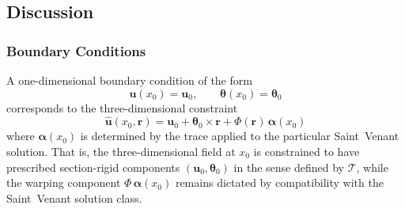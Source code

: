 
\clearpage 

\subsection{Discussion}


\subsubsection{Boundary Conditions}

A one-dimensional boundary condition of the form
\begin{equation}
\bm{u}(x_0) = \bm{u}_0, \qquad \bm{\theta}(x_0) = \bm{\theta}_0
\label{eq:1d-bc}
\end{equation}
corresponds to the three-dimensional constraint
\begin{equation}
\hat{\bm{u}}(x_0, \bm{r}) = \bm{u}_0 + \bm{\theta}_0 \times \bm{r} + \Phi(\bm{r})\,\bm{\alpha}(x_0)
\label{eq:3d-bc}
\end{equation}
where $\bm{\alpha}(x_0)$ is determined by the trace applied to the particular 
Saint~Venant solution. 
That is, the three-dimensional field at $x_0$ is 
constrained to have prescribed section-rigid components $(\bm{u}_0, \bm{\theta}_0)$ 
in the sense defined by $\mathcal{T}$, while the warping component $\Phi\,\bm{\alpha}(x_0)$ 
remains dictated by compatibility with the Saint~Venant solution class.




